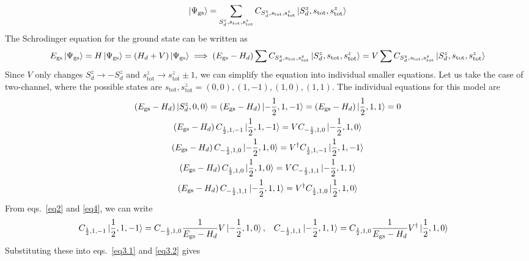 \documentclass[12pt]{revtex4-2}
\begin{document}
\begin{align}
	\label{gstate_Expand}
\ket{\Psi_\text{gs}} = \sum_{S_d^z, s_\text{tot},s_\text{tot}^z}C_{S_d^z, s_\text{tot},s_\text{tot}^z}\ket{S_d^z, s_\text{tot}, s_\text{tot}^z}
\end{align}
The Schrodinger equation for the ground state can be written as
\begin{align}
	E_\text{gs}\ket{\Psi_\text{gs}} = H \ket{\Psi_\text{gs}} = \left(H_d + V\right)\ket{\Psi_\text{gs}} \implies \left(E_\text{gs} - H_d\right)\sum C_{S_d^z, s_\text{tot},s_\text{tot}^z}\ket{S_d^z, s_\text{tot}, s_\text{tot}^z} = V\sum C_{S_d^z, s_\text{tot},s_\text{tot}^z}\ket{S_d^z, s_\text{tot}, s_\text{tot}^z}
\end{align}
Since \(V\) only changes \(S_d^z \to -S_d^z\) and \(s^z_\text{tot} \to s^z_\text{tot} \pm 1\), we can simplify the equation into individual smaller equations. Let us take the case of two-channel, where the possible states are \(s_\text{tot},s^z_\text{tot} = (0,0), (1,-1), (1,0), (1,1)\). The individual equations for this model are
\begin{gather}
	\left(E_\text{gs} - H_d\right) \ket{S_d^z, 0, 0} = \left(E_\text{gs} - H_d\right) \ket{-\frac{1}{2}, 1, -1} = \left(E_\text{gs} - H_d\right) \ket{\frac{1}{2}, 1, 1}  = 0 \label{no_V}\\
	\left(E_\text{gs} - H_d\right) C_{\frac{1}{2}, 1, -1}\ket{\frac{1}{2}, 1, -1} = V C_{-\frac{1}{2}, 1, 0}\ket{-\frac{1}{2}, 1, 0}\label{eq2}\\
	\left(E_\text{gs} - H_d\right) C_{-\frac{1}{2}, 1, 0}\ket{-\frac{1}{2}, 1, 0} = V^\dagger C_{\frac{1}{2}, 1, -1}\ket{\frac{1}{2}, 1, -1}\label{eq3.2}\\
	\left(E_\text{gs} - H_d\right) C_{\frac{1}{2}, 1, 0}\ket{\frac{1}{2}, 1, 0} = V C_{-\frac{1}{2}, 1, 1}\ket{-\frac{1}{2}, 1, 1} \label{eq3.1}\\
	\left(E_\text{gs} - H_d\right) C_{-\frac{1}{2}, 1, 1}\ket{-\frac{1}{2}, 1, 1} = V^\dagger C_{\frac{1}{2}, 1, 0}\ket{\frac{1}{2}, 1, 0}\label{eq4}
\end{gather}
From eqs.~\ref{eq2} and \ref{eq4}, we can write
\begin{align}
	C_{\frac{1}{2}, 1, -1}\ket{\frac{1}{2}, 1, -1} &= C_{-\frac{1}{2}, 1, 0}\frac{1}{E_\text{gs} - H_d}V \ket{-\frac{1}{2}, 1, 0}, &&C_{-\frac{1}{2}, 1, 1}\ket{-\frac{1}{2}, 1, 1} = C_{\frac{1}{2}, 1, 0}\frac{1}{E_\text{gs} - H_d}V^\dagger \ket{\frac{1}{2}, 1, 0}
\end{align}
Substituting these into eqs.~\ref{eq3.1} and \ref{eq3.2} gives 
\end{document}
